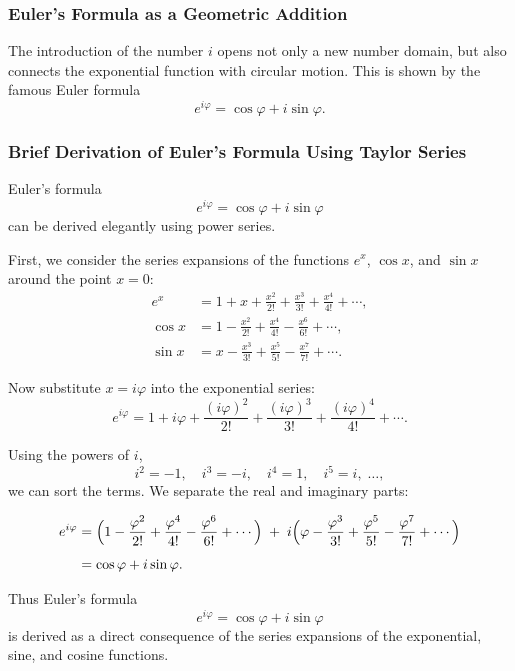 \subsubsection*{Euler's Formula as a Geometric Addition}

The introduction of the number $i$ opens not only a new number domain,
but also connects the exponential function with circular motion.
This is shown by the famous Euler formula
\[
e^{i\varphi} = \cos\varphi + i\sin\varphi.
\]

\subsubsection*{Brief Derivation of Euler's Formula Using Taylor Series}

Euler's formula
\[
e^{i\varphi} = \cos\varphi + i\sin\varphi
\]
can be derived elegantly using power series.

First, we consider the series expansions of the functions
$e^x$, $\cos x$, and $\sin x$ around the point $x=0$:
\begin{align*}
	e^x &= 1 + x + \frac{x^2}{2!} + \frac{x^3}{3!} + \frac{x^4}{4!} + \cdots,\\[1ex]
	\cos x &= 1 - \frac{x^2}{2!} + \frac{x^4}{4!} - \frac{x^6}{6!} + \cdots,\\[1ex]
	\sin x &= x - \frac{x^3}{3!} + \frac{x^5}{5!} - \frac{x^7}{7!} + \cdots.
\end{align*}

Now substitute $x = i\varphi$ into the exponential series:
\[
e^{i\varphi} = 1 + i\varphi + \frac{(i\varphi)^2}{2!}
+ \frac{(i\varphi)^3}{3!}
+ \frac{(i\varphi)^4}{4!}
+ \cdots.
\]

Using the powers of $i$,
\[
i^2 = -1,\quad i^3 = -i,\quad i^4 = 1,\quad i^5 = i,\;\dots,
\]
we can sort the terms. We separate the real and imaginary parts:

\begin{align*}
	e^{i\varphi}
	&= \Bigl(1 - \frac{\varphi^2}{2!} + \frac{\varphi^4}{4!} - \frac{\varphi^6}{6!} + \cdots\Bigr)
	\;+\; i\Bigl(\varphi - \frac{\varphi^3}{3!} + \frac{\varphi^5}{5!} - \frac{\varphi^7}{7!} + \cdots\Bigr)\\[1ex]
	&= \cos\varphi + i\sin\varphi.
\end{align*}

Thus Euler's formula
\[
e^{i\varphi} = \cos\varphi + i\sin\varphi
\]
is derived as a direct consequence of the series expansions of the exponential,
sine, and cosine functions.

